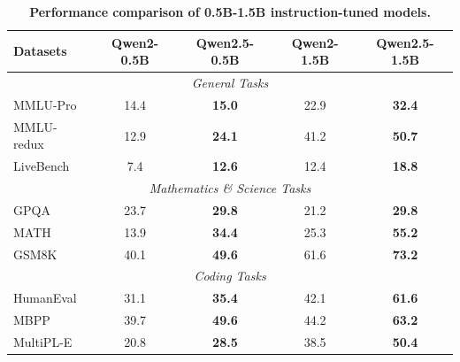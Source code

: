\begin{table}[t]

\centering

\caption{\textbf{Performance comparison of 0.5B-1.5B instruction-tuned models.}}

\label{tab:2b-instruct}
\small
\setlength{\tabcolsep}{2.6pt}

\begin{tabular}{@{}lcccc@{}}

\toprule

\textbf{Datasets} & \textbf{Qwen2-0.5B} & \textbf{Qwen2.5-0.5B} & \textbf{Qwen2-1.5B} & \textbf{Qwen2.5-1.5B} \\

\midrule

\multicolumn{5}{c}{\textit{General Tasks}} \\

\midrule

MMLU-Pro & 14.4 & \textbf{15.0} & 22.9 & \textbf{32.4} \\

MMLU-redux & 12.9 & \textbf{24.1} & 41.2 & \textbf{50.7} \\

LiveBench & 7.4 & \textbf{12.6} & 12.4 & \textbf{18.8} \\

\midrule

\multicolumn{5}{c}{\textit{Mathematics \& Science Tasks}} \\

\midrule

GPQA & 23.7 & \textbf{29.8} & 21.2 & \textbf{29.8} \\

MATH & 13.9 & \textbf{34.4} & 25.3 & \textbf{55.2} \\

GSM8K & 40.1 & \textbf{49.6} & 61.6 & \textbf{73.2} \\

\midrule

\multicolumn{5}{c}{\textit{Coding Tasks}} \\

\midrule

HumanEval & 31.1 & \textbf{35.4} & 42.1 & \textbf{61.6} \\

MBPP & 39.7 & \textbf{49.6} & 44.2 & \textbf{63.2} \\

MultiPL-E & 20.8 & \textbf{28.5} & 38.5 & \textbf{50.4} \\


\end{tabular}
\end{table}
